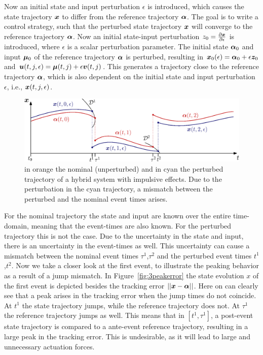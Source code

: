 \documentclass[../DC2017114Bouma.tex]{subfiles}
\begin{document}
Now an initial state and input perturbation $\epsilon$ is introduced, which causes the state trajectory ${\boldsymbol{x}}$ to differ from the reference trajectory $\boldsymbol{\alpha}$. The goal is to write a control strategy, such that the perturbed state trajectory ${\boldsymbol{x}}$ will converge to the reference trajectory $\boldsymbol{\alpha}$. Now an initial state-input perturbation $z_0 = \frac{\partial{\boldsymbol{x}}}{\partial\epsilon}$ is introduced, where $\epsilon$ is a scalar perturbation parameter. The initial state $\boldsymbol{\alpha}_0$ and input $\boldsymbol{\mu}_0$ of the reference trajectory $\boldsymbol{\alpha}$ is perturbed, resulting in ${\boldsymbol{x}}_0(\epsilon) = \boldsymbol{\alpha}_0 + \epsilon{\boldsymbol{z}}_0$ and ${\boldsymbol{u}}(t,j,\epsilon) = \boldsymbol{\mu}(t,j) + \epsilon{\boldsymbol{v}}(t,j)$. This generates a trajectory close to the reference trajectory $\boldsymbol{\alpha}$, which is also dependent on the initial state and input perturbation $\epsilon$, i.e., ${\boldsymbol{x}}(t,j,\epsilon)$.
%
%
\begin{figure}[h]
\centering
\includegraphics[width=.9\textwidth]{perturbedtraj.eps}\caption{in orange the nominal (unperturbed) and in cyan the perturbed trajectory of a hybrid system with impulsive effects. Due to the perturbation in the cyan trajectory, a mismatch between the perturbed and the nominal event times arises.} \label{fig:3perturbedtraj}
\end{figure}
For the nominal trajectory the state and input are known over the entire time-domain, meaning that the event-times are also known. For the perturbed trajectory this is not the case. Due to the uncertainty in the state and input, there is an uncertainty in the event-times as well. This uncertainty can cause a mismatch between the nominal event times $\tau^1$,$\tau^2$ and the perturbed event times $t^1$,$t^2$. Now we take a closer look at the first event, to illustrate the peaking behavior as a result of a jump mismatch. In Figure~\ref{fig:3peakerror} the state evolution $x$ of the first event is depicted besides the tracking error $||{\boldsymbol{x}}-\boldsymbol{\alpha}||$. Here on can clearly see that a peak arises in the tracking error when the jump times do not coincide. At $t^1$ the state trajectory jumps, while the reference trajectory does not. At $\tau^1$ the reference trajectory jumps as well. This means that in $[t^1,\tau^1]$, a post-event state trajectory is compared to a ante-event reference trajectory, resulting in a large peak in the tracking error. This is undesirable, as it will lead to large and unnecessary actuation forces.
\end{document}
